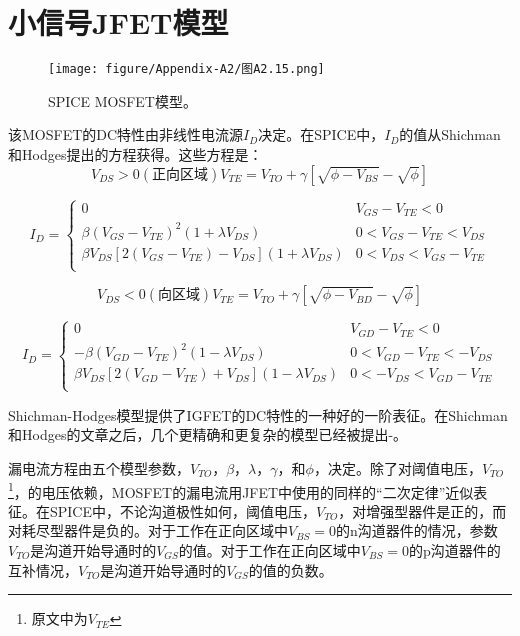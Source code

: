 \section{小信号JFET模型}
\begin{figure}[htbp]
\small
    \centering
    \texttt{[image: figure/Appendix-A2/图A2.15.png]}
    \caption{SPICE MOSFET模型。}
    \label{图A2.15}
\end{figure}

该MOSFET的DC特性由非线性电流源$I_D$决定。在SPICE中，$I_D$的值从Shichman和Hodges\cite{ref-90}提出的方程获得。这些方程是：
\begin{equation}
    V_{DS}>0 (正向区域)
    V_{TE} = V_{TO} + \gamma[\sqrt{\phi-V_{BS}}-\sqrt{\phi}]
    \label{eq:A2.56}
\end{equation}

\begin{equation}
    I_D = \left\{\begin{matrix}
0 &V_{GS}-V_{TE}<0  \\
\beta(V_{GS}-V_{TE})^2(1+\lambda V_{DS}) &0<V_{GS}-V_{TE}<V_{DS}  \\
\beta V_{DS}[2(V_{GS}-V_{TE})-V_{DS}](1+\lambda V_{DS}) &0<V_{DS}<V_{GS}-V_{TE}  \\
\end{matrix}\right.
\label{eq:A2.57}
\end{equation}

\begin{equation}
    V_{DS}<0 (向区域)
    V_{TE} = V_{TO} + \gamma[\sqrt{\phi-V_{BD}}-\sqrt{\phi}]
    \label{eq:A2.58}
\end{equation}

\begin{equation}
    I_D = \left\{\begin{matrix}
0 &V_{GD}-V_{TE}<0  \\
-\beta(V_{GD}-V_{TE})^2(1-\lambda V_{DS}) &0<V_{GD}-V_{TE}<-V_{DS}  \\
\beta V_{DS}[2(V_{GD}-V_{TE})+V_{DS}](1-\lambda V_{DS}) &0<-V_{DS}<V_{GD}-V_{TE}  \\
\end{matrix}\right.
\label{eq:A2.59}
\end{equation}

Shichman-Hodges模型提供了IGFET的DC特性的一种好的一阶表征。在Shichman和Hodges的文章之后，几个更精确和更复杂的模型已经被提出\cite{ref-91}-\cite{ref-94}。

漏电流方程由五个模型参数，$V_{TO}$，$\beta$，$\lambda$，$\gamma$，和$\phi$，决定。除了对阈值电压，$V_{TO}$\footnote{原文中为$V_{TE}$}，的电压依赖，MOSFET的漏电流用JFET中使用的同样的“二次定律”近似表征。在SPICE中，不论沟道极性如何，阈值电压，$V_{TO}$，对增强型器件是正的，而对耗尽型器件是负的。对于工作在正向区域中$V_{BS}=0$的n沟道器件的情况，参数$V_{TO}$是沟道开始导通时的$V_{GS}$的值。对于工作在正向区域中$V_{BS}=0$的p沟道器件的互补情况，$V_{TO}$是沟道开始导通时的$V_{GS}$的值的负数。

